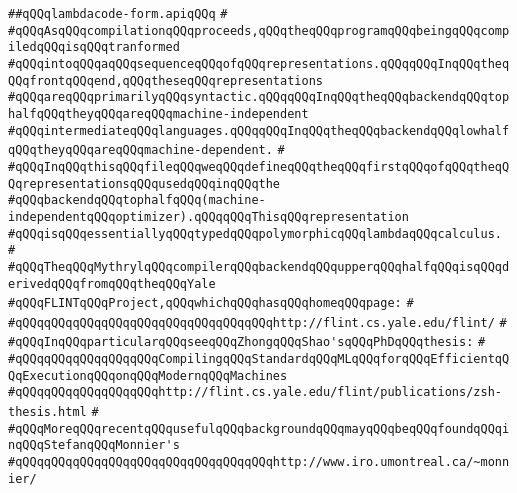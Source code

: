 \label{src/lib/compiler/back/top/lambdacode/lambdacode-form.api}
\verb|##qQQqlambdacode-form.apiqQQq|\newline
\verb|#|\newline
\verb|#qQQqAsqQQqcompilationqQQqproceeds,qQQqtheqQQqprogramqQQqbeingqQQqcompiledqQQqisqQQqtranformed|\newline
\verb|#qQQqintoqQQqaqQQqsequenceqQQqofqQQqrepresentations.qQQqqQQqInqQQqtheqQQqfrontqQQqend,qQQqtheseqQQqrepresentations|\newline
\verb|#qQQqareqQQqprimarilyqQQqsyntactic.qQQqqQQqInqQQqtheqQQqbackendqQQqtophalfqQQqtheyqQQqareqQQqmachine-independent|\newline
\verb|#qQQqintermediateqQQqlanguages.qQQqqQQqInqQQqtheqQQqbackendqQQqlowhalfqQQqtheyqQQqareqQQqmachine-dependent.|\newline
\verb|#|\newline
\verb|#qQQqInqQQqthisqQQqfileqQQqweqQQqdefineqQQqtheqQQqfirstqQQqofqQQqtheqQQqrepresentationsqQQqusedqQQqinqQQqthe|\newline
\verb|#qQQqbackendqQQqtophalfqQQq(machine-independentqQQqoptimizer).qQQqqQQqThisqQQqrepresentation|\newline
\verb|#qQQqisqQQqessentiallyqQQqtypedqQQqpolymorphicqQQqlambdaqQQqcalculus.|\newline
\verb|#|\newline
\verb|#qQQqTheqQQqMythrylqQQqcompilerqQQqbackendqQQqupperqQQqhalfqQQqisqQQqderivedqQQqfromqQQqtheqQQqYale|\newline
\verb|#qQQqFLINTqQQqProject,qQQqwhichqQQqhasqQQqhomeqQQqpage:|\newline
\verb|#|\newline
\verb|#qQQqqQQqqQQqqQQqqQQqqQQqqQQqqQQqqQQqhttp://flint.cs.yale.edu/flint/|\newline
\verb|#|\newline
\verb|#qQQqInqQQqparticularqQQqseeqQQqZhongqQQqShao'sqQQqPhDqQQqthesis:|\newline
\verb|#|\newline
\verb|#qQQqqQQqqQQqqQQqqQQqCompilingqQQqStandardqQQqMLqQQqforqQQqEfficientqQQqExecutionqQQqonqQQqModernqQQqMachines|\newline
\verb|#qQQqqQQqqQQqqQQqqQQqhttp://flint.cs.yale.edu/flint/publications/zsh-thesis.html|\newline
\verb|#|\newline
\verb|#qQQqMoreqQQqrecentqQQqusefulqQQqbackgroundqQQqmayqQQqbeqQQqfoundqQQqinqQQqStefanqQQqMonnier's|\newline
\verb|#qQQqqQQqqQQqqQQqqQQqqQQqqQQqqQQqqQQqhttp://www.iro.umontreal.ca/~monnier/|\newline
